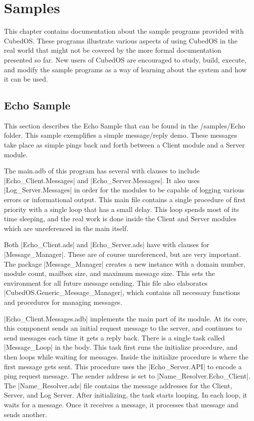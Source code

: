 
\chapter{Samples}
\label{chapt:samples}

This chapter contains documentation about the sample programs provided with Cubed\-OS. These
programs illustrate various aspects of using CubedOS in the real world that might not be
covered by the more formal documentation presented so far. New users of CubedOS are encouraged to
study, build, execute, and modify the sample programs as a way of learning about the system and
how it can be used.

\section{Echo Sample}
\label{sec:echo-sample}

This section describes the Echo Sample that can be found in the /samples/Echo folder. This
sample exemplifies a simple message/reply demo. These messages take place as simple pings back
and forth between a Client module and a Server module. 

The main.adb of this program has several with clauses to include |Echo_Client.Messages| and
|Echo_Server.Messages|. It also uses |Log_Server.Messages| in order for the modules to be
capable of logging various errors or informational output. This main file contains a single
procedure of first priority with a single loop that has a small delay. This loop spends most of
its time sleeping, and the real work is done inside the Client and Server modules which are
unreferenced in the main itself. 

Both |Echo_Client.ads| and |Echo_Server.ads| have with clauses for |Message_Manager|. These are
of course unreferenced, but are very important. The package |Message_Manager| creates a new
instance with a domain number, module count, mailbox size, and maximum message size. This sets
the environment for all future message sending. This file also elaborates
|CubedOS.Generic_Message_Manager|, which contains all necessary functions and procedures for
managing messages. 

|Echo_Client.Messages.adb| implements the main part of its module. At its core, this component
sends an initial request message to the server, and continues to send messages each time it gets
a reply back. There is a single task called |Message_Loop| in the body. This task first runs the
initialize procedure, and then loops while waiting for messages. Inside the initialize procedure
is where the first message gets sent. This procedure uses the |Echo_Server.API| to encode a ping
request message. The sender address is set to |Name_Resolver.Echo_Client|. The
|Name_Resolver.ads| file contains the message addresses for the Client, Server, and Log Server.
After initializing, the task starts looping. In each loop, it waits for a message. Once it
receives a message, it processes that message and sends another.

